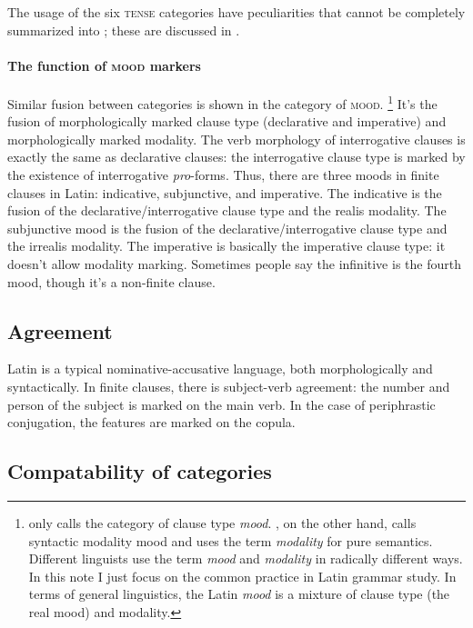 \documentclass[a4paper, oneside, 12pt]{report}
\newcommand*{\term}[1]{\emph{#1}}
\newcommand*{\category}[1]{\textsc{#1}}
\begin{document}
The usage of the six \category{tense} categories have peculiarities
that cannot be completely summarized into ;
these are discussed in .

\paragraph*{The function of \category{mood} markers}
Similar fusion between categories is shown in the category of \category{mood}.%
\footnote{
    \citet{dixon2009basic1} only calls the category of clause type \term{mood}.
    \citet{cgel}, on the other hand, 
    calls syntactic modality mood 
    and uses the term \term{modality} for pure semantics.
    Different linguists use the term \term{mood} and \term{modality} in radically different ways.
    In this note I just focus on the common practice in Latin grammar study.
    In terms of general linguistics, 
    the Latin \term{mood} is a mixture of clause type (the real mood)
    and modality.
}
It's the fusion of morphologically marked clause type 
(declarative and imperative)
and morphologically marked modality.
The verb morphology of interrogative clauses is exactly the same as declarative clauses:
the interrogative clause type is marked by the existence of interrogative \term{pro}-forms.
Thus, there are three moods in finite clauses in Latin:
\acl{indicative}, \acl{subjunctive}, and \acl{imperative}.
The \acl{indicative} is the fusion of 
the declarative/interrogative clause type and the realis modality.
The \acl{subjunctive} mood is the fusion of 
the declarative/interrogative clause type and the irrealis modality.
The \acl{imperative} is basically the imperative clause type:
it doesn't allow modality marking.
Sometimes people say the infinitive is the fourth mood,
though it's a non-finite clause.


\subsection{Agreement}\label{sec:agreement-abs}

Latin is a typical nominative-accusative language,
both morphologically and syntactically.
In finite clauses, 
there is subject-verb agreement:
the number and person of the subject is marked on the main verb.
In the case of periphrastic conjugation,
the features are marked on the copula.

\subsection{Compatability of categories}
\end{document}
